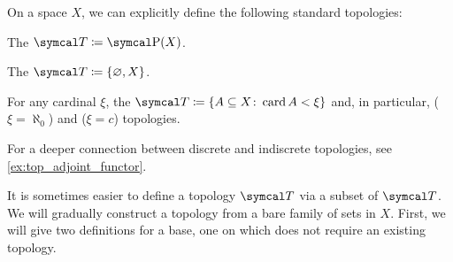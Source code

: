 \begin{definition}\label{def:standard_topologies}
  On a space $X$, we can explicitly define the following standard topologies:
  \begin{defenum}
    \item\label{def:standard_topologies/discrete} The  $\Cal{T} \coloneqq \Power(X)$.
    \item\label{def:standard_topologies/indiscrete} The  $\Cal{T} \coloneqq \{ \varnothing, X \}$.
    \item\label{def:standard_topologies/co_cardinal} For any cardinal $\xi$, the  $\Cal{T} \coloneqq \{ A \subseteq X \colon \Card A < \xi \}$ and, in particular,  ($\xi = \aleph_0$) and  ($\xi = c$) topologies.
  \end{defenum}

  For a deeper connection between discrete and indiscrete topologies, see \cref{ex:top_adjoint_functor}.
\end{definition}

\begin{note}\label{note:abritrary_family_to_topology}
  It is sometimes easier to define a topology $\Cal{T}$ via a subset of $\Cal{T}$. We will gradually construct a topology from a bare family of sets in $X$. First, we will give two definitions for a base, one on which does not require an existing topology.
\end{note}

